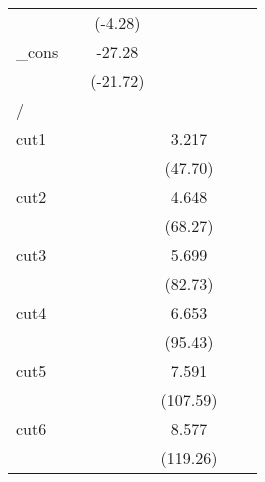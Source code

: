 {\begin{tabular}{l*{5}{c}}
            &                     &     (-4.28)         &                     &                     &                     \\
[1em]
\_cons      &                     &      -27.28\sym{***}&                     &                     &                     \\
            &                     &    (-21.72)         &                     &                     &                     \\
\hline
/           &                     &                     &                     &                     &                     \\
cut1        &                     &                     &       3.217\sym{***}&                     &                     \\
            &                     &                     &     (47.70)         &                     &                     \\
[1em]
cut2        &                     &                     &       4.648\sym{***}&                     &                     \\
            &                     &                     &     (68.27)         &                     &                     \\
[1em]
cut3        &                     &                     &       5.699\sym{***}&                     &                     \\
            &                     &                     &     (82.73)         &                     &                     \\
[1em]
cut4        &                     &                     &       6.653\sym{***}&                     &                     \\
            &                     &                     &     (95.43)         &                     &                     \\
[1em]
cut5        &                     &                     &       7.591\sym{***}&                     &                     \\
            &                     &                     &    (107.59)         &                     &                     \\
[1em]
cut6        &                     &                     &       8.577\sym{***}&                     &                     \\
            &                     &                     &    (119.26)         &                     &                     \\

\end{tabular}}
